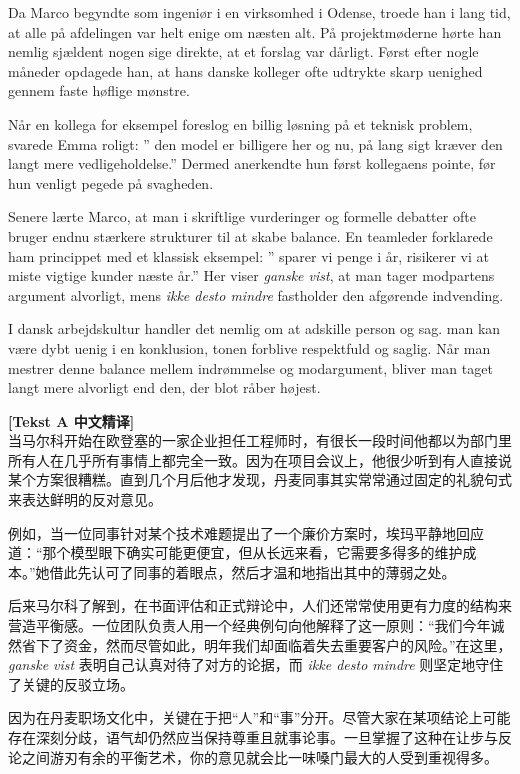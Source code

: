 Da Marco begyndte som ingeniør i en virksomhed i Odense, troede han i lang tid, at alle på afdelingen var helt enige om næsten alt. På projektmøderne hørte han nemlig sjældent nogen sige direkte, at et forslag var dårligt. Først efter nogle måneder opdagede han, at hans danske kolleger ofte udtrykte skarp uenighed gennem faste høflige mønstre.

Når en kollega for eksempel foreslog en billig løsning på et teknisk problem, svarede Emma roligt: ” den model er billigere her og nu,  på lang sigt kræver den langt mere vedligeholdelse.” Dermed anerkendte hun først kollegaens pointe, før hun venligt pegede på svagheden.

Senere lærte Marco, at man i skriftlige vurderinger og formelle debatter ofte bruger endnu stærkere strukturer til at skabe balance. En teamleder forklarede ham princippet med et klassisk eksempel: ” sparer vi penge i år,  risikerer vi at miste vigtige kunder næste år.” Her viser \textit{ganske vist}, at man tager modpartens argument alvorligt, mens \textit{ikke desto mindre} fastholder den afgørende indvending.

I dansk arbejdskultur handler det nemlig om at adskille person og sag.  man kan være dybt uenig i en konklusion,  tonen  forblive respektfuld og saglig. Når man mestrer denne balance mellem indrømmelse og modargument, bliver man taget langt mere alvorligt end den, der blot råber højest.

\begin{transbox}
\small
\textbf{\color{NCDTeal}[Tekst A 中文精译]}\\
当马尔科开始在欧登塞的一家企业担任工程师时，有很长一段时间他都以为部门里所有人在几乎所有事情上都完全一致。因为在项目会议上，他很少听到有人直接说某个方案很糟糕。直到几个月后他才发现，丹麦同事其实常常通过固定的礼貌句式来表达鲜明的反对意见。

例如，当一位同事针对某个技术难题提出了一个廉价方案时，埃玛平静地回应道：“那个模型眼下确实可能更便宜，但从长远来看，它需要多得多的维护成本。”她借此先认可了同事的着眼点，然后才温和地指出其中的薄弱之处。

后来马尔科了解到，在书面评估和正式辩论中，人们还常常使用更有力度的结构来营造平衡感。一位团队负责人用一个经典例句向他解释了这一原则：“我们今年诚然省下了资金，然而尽管如此，明年我们却面临着失去重要客户的风险。”在这里，\textit{ganske vist} 表明自己认真对待了对方的论据，而 \textit{ikke desto mindre} 则坚定地守住了关键的反驳立场。

因为在丹麦职场文化中，关键在于把“人”和“事”分开。尽管大家在某项结论上可能存在深刻分歧，语气却仍然应当保持尊重且就事论事。一旦掌握了这种在让步与反论之间游刃有余的平衡艺术，你的意见就会比一味嗓门最大的人受到重视得多。
\end{transbox}

